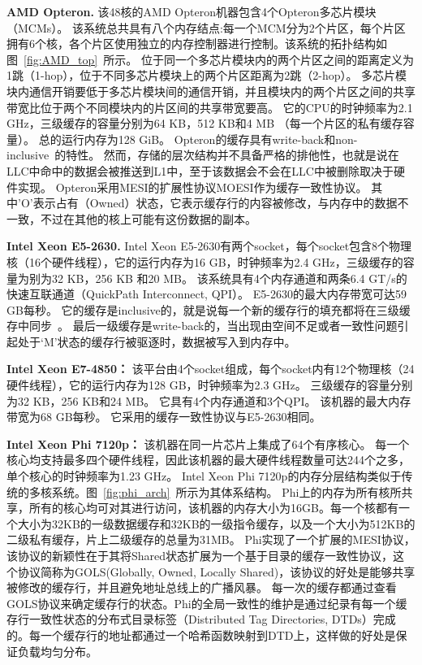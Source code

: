 \textbf{AMD Opteron.} 该48核的AMD Opteron机器包含4个Opteron多芯片模块（MCMs）。
该系统总共具有八个内存结点:每一个MCM分为2个片区，每个片区拥有6个核，各个片区使用独立的内存控制器进行控制。该系统的拓扑结构如图~\ref{fig:AMD_top}~所示。
位于同一个多芯片模块内的两个片区之间的距离定义为1跳（1-hop），位于不同多芯片模块上的两个片区距离为2跳（2-hop）。
多芯片模块内通信开销要低于多芯片模块间的通信开销，并且模块内的两个片区之间的共享带宽比位于两个不同模块内的片区间的共享带宽要高。
它的CPU的时钟频率为2.1 GHz，三级缓存的容量分别为64 KB，512 KB和4 MB （每一个片区的私有缓存容量）。
总的运行内存为128 GiB。
Opteron的缓存具有write-back和non-inclusive~\cite{Conway2010Cache}的特性。
然而，存储的层次结构并不具备严格的排他性，也就是说在LLC中命中的数据会被推送到L1中，至于该数据会不会在LLC中被删除取决于硬件实现。 
Opteron采用MESI的扩展性协议MOESI作为缓存一致性协议。
其中’O’表示占有（Owned）状态，它表示缓存行的内容被修改，与内存中的数据不一致，不过在其他的核上可能有这份数据的副本。

\textbf{Intel Xeon E5-2630.} Intel Xeon E5-2630有两个socket，每个socket包含8个物理核（16个硬件线程），它的运行内存为16 GB，时钟频率为2.4 GHz，三级缓存的容量为别为32 KB，256 KB 和20 MB。
该系统具有4个内存通道和两条6.4 GT/s的快速互联通道（QuickPath Interconnect, QPI）。
E5-2630的最大内存带宽可达59 GB每秒。
它的缓存是inclusive的，就是说每一个新的缓存行的填充都将在三级缓存中同步~\cite{intel2016}。
最后一级缓存是write-back的，当出现由空间不足或者一致性问题引起处于‘M’状态的缓存行被驱逐时，数据被写入到内存中。

\textbf{Intel Xeon E7-4850：} 该平台由4个socket组成，每个socket内有12个物理核（24硬件线程），它的运行内存为128 GB，时钟频率为2.3 GHz。
三级缓存的容量分别为32 KB，256 KB和24 MB。
它具有4个内存通道和3个QPI。
该机器的最大内存带宽为68 GB每秒。
它采用的缓存一致性协议与E5-2630相同。

\textbf{Intel Xeon Phi 7120p：} 该机器在同一片芯片上集成了64个有序核心。
每一个核心均支持最多四个硬件线程，因此该机器的最大硬件线程数量可达244个之多，单个核心的时钟频率为1.23 GHz。
Intel Xeon Phi 7120p的内存分层结构类似于传统的多核系统。图~\ref{fig:phi_arch}~所示为其体系结构。
Phi上的内存为所有核所共享，所有的核心均可对其进行访问，该机器的内存大小为16GB。每一个核都有一个大小为32KB的一级数据缓存和32KB的一级指令缓存，以及一个大小为512KB的二级私有缓存，片上二级缓存的总量为31MB。
Phi实现了一个扩展的MESI协议，该协议的新颖性在于其将Shared状态扩展为一个基于目录的缓存一致性协议，这个协议简称为GOLS(Globally, Owned, Locally Shared)，该协议的好处是能够共享被修改的缓存行，并且避免地址总线上的广播风暴。
每一次的缓存都通过查看GOLS协议来确定缓存行的状态。Phi的全局一致性的维护是通过纪录有每一个缓存行一致性状态的分布式目录标签（Distributed Tag Directories, DTDs）完成的。每一个缓存行的地址都通过一个哈希函数映射到DTD上，这样做的好处是保证负载均匀分布。

